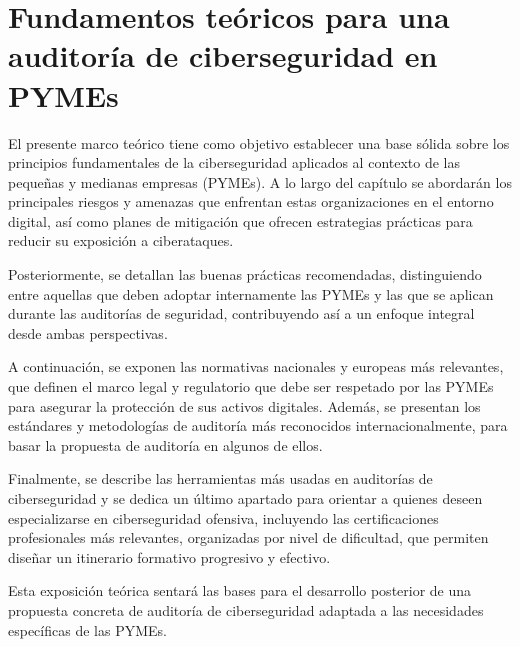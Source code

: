 \documentclass[a4paper, 10pt]{article}
\begin{document}
\section{Fundamentos teóricos para una auditoría de ciberseguridad en PYMEs}
\par\vspace{0.5cm}


El presente marco teórico tiene como objetivo establecer una base sólida sobre los principios fundamentales de la ciberseguridad aplicados al contexto de las pequeñas y medianas empresas (PYMEs). A lo largo del capítulo se abordarán los principales riesgos y amenazas que enfrentan estas organizaciones en el entorno digital, así como planes de mitigación que ofrecen estrategias prácticas para reducir su exposición a ciberataques.

\par\vspace{0.5cm}

Posteriormente, se detallan las buenas prácticas recomendadas, distinguiendo entre aquellas que deben adoptar internamente las PYMEs y las que se aplican durante las auditorías de seguridad, contribuyendo así a un enfoque integral desde ambas perspectivas.

\par\vspace{0.5cm}

A continuación, se exponen las normativas nacionales y europeas más relevantes, que definen el marco legal y regulatorio que debe ser respetado por las PYMEs para asegurar la protección de sus activos 
digitales. Además, se presentan los estándares y metodologías de auditoría más reconocidos internacionalmente, para basar la propuesta de auditoría en algunos de ellos.

\par\vspace{0.5cm}


Finalmente, se describe las herramientas más usadas en auditorías de ciberseguridad y se dedica un último apartado para orientar a quienes deseen especializarse en ciberseguridad ofensiva, incluyendo las certificaciones profesionales más relevantes, organizadas por nivel de dificultad, que permiten diseñar un itinerario formativo progresivo y efectivo.
\par\vspace{0.5cm}

Esta exposición teórica sentará las bases para el desarrollo posterior de una propuesta concreta de auditoría de ciberseguridad adaptada a las necesidades específicas de las PYMEs.
\end{document}
